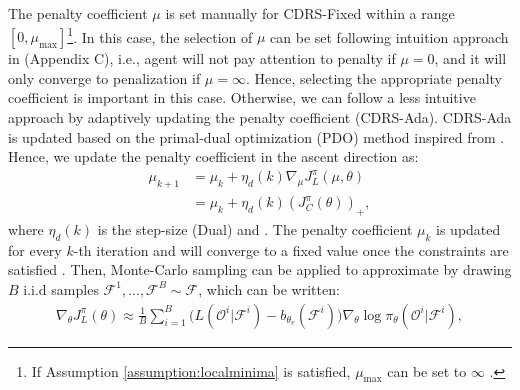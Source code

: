 The penalty coefficient ${\mu}$ is set manually \cite{vnf_drl_solozabal,cmpd_solo} for CDRS-Fixed within a range $[0, \mu_{\text{max}} ]$\footnote{If Assumption \ref{assumption:localminima} is satisfied, $\mu_{\text{max}}$ can be set to $\infty$ \cite{reward_constraint}.}. In this case, the selection of ${\mu}$ can be set following intuition approach in \cite{vnf_drl_solozabal} (Appendix C), i.e., agent will not pay attention to penalty if $\mu = 0$, and it will only converge to penalization if $\mu = \infty$. Hence, selecting the appropriate penalty coefficient is important in this case. Otherwise, we can follow a less intuitive approach by adaptively updating the penalty coefficient (CDRS-Ada). CDRS-Ada is updated based on the primal-dual optimization (PDO) method inspired from \cite{pdo_risk}. Hence, we update the penalty coefficient in the ascent direction as:
%
\begin{align} \label{eq:update2}
{\mu}_{k+1} &= {\mu}_{k} + \eta_d(k) \nabla_\mu J_L^\pi({\mu},\theta) \\
& = {\mu}_{k} + \eta_d(k) (  J_{C}^\pi(\theta))_+, 
\end{align} 
where $\eta_d(k)$ is the step-size (Dual) and . The penalty coefficient ${\mu}_{k}$ is updated for every $k$-th iteration and will converge to a fixed value once the constraints are satisfied \cite{reward_constraint,pdo_risk}. 
%
%
Then, Monte-Carlo sampling can be applied to approximate  by drawing  $B$ i.i.d samples $ \!\mathcal{F}^1,...,\mathcal{F}^B \!\sim\! \mathcal{F}$, which can be written:
\begin{align} \label{eq:lag_grads}
\!	\nabla_{\!\theta} J_L^\pi(\theta) \! \approx \! \frac{1}{B} \! \sum_{i=1}^{B} \! \! \Big(\! L(\mathcal{O}^i | \mathcal{F}^i) \! - \! b_{\theta_v}(\mathcal{F}^i)\! \Big) \! \nabla_{\!\theta} \! \log \! \pi_\theta(\mathcal{O}^i | \mathcal{F}^i), \!\!
\end{align} 

